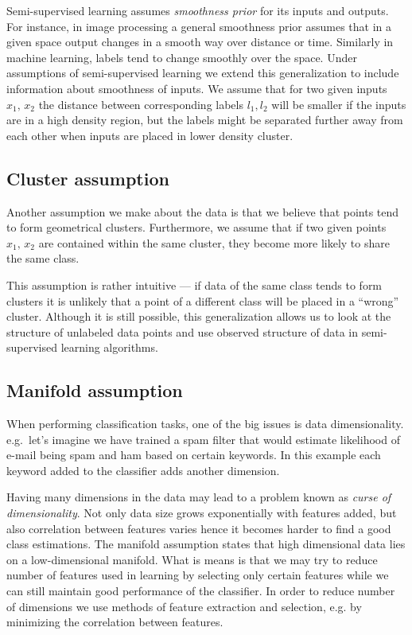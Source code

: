 \documentclass[12pt, a4paper, pdflatex]{report}
\begin{document}
Semi-supervised learning assumes \emph{smoothness prior} for its inputs and outputs\cite{chapelle06}. For instance, in image processing a general smoothness prior assumes that in a given space output changes in a smooth way over distance or time\cite{stan95}. Similarly in machine learning, labels tend to change smoothly over the space. Under assumptions of semi-supervised learning we extend this generalization to include information about smoothness of inputs. We assume that for two given inputs $ x_1\text{, }x_2 $ the distance between corresponding labels $ l_1, l_2 $ will be smaller if the inputs are in a high density region, but the labels might be separated further away from each other when inputs are placed in lower density cluster.

\subsection{Cluster assumption}
\label{sec:clusterassump}

Another assumption we make about the data is that we believe that points tend to form geometrical clusters. Furthermore, we assume that if two given points $ x_1\text{, }x_2 $ are contained within the same cluster, they become more likely to share the same class\cite{chapelle06}.

This assumption is rather intuitive ---  if data of the same class tends to form clusters it is unlikely that a point of a different class will be placed in a ``wrong'' cluster. Although it is still possible, this generalization allows us to look at the structure of unlabeled data points and use observed structure of data in semi-supervised learning algorithms.

\subsection{Manifold assumption}
 
When performing classification tasks, one of the big issues is data dimensionality. e.g.\ let's imagine we have trained a spam filter that would estimate likelihood of e-mail being spam and ham based on certain keywords. In this example each keyword added to the classifier adds another dimension. 

Having many dimensions in the data may lead to a problem known as \textit{curse of dimensionality}\cite{chapelle06}. Not only data size grows exponentially with features added, but also correlation between features varies hence it becomes harder to find a good class estimations. The manifold assumption states that high dimensional data lies on a low-dimensional manifold. What is means is that we may try to reduce number of features used in learning by selecting only certain features while we can still maintain good performance of the classifier. In order to reduce number of dimensions we use methods of feature extraction and selection, e.g. by minimizing the correlation between features\cite{Hall99}.
\end{document}
